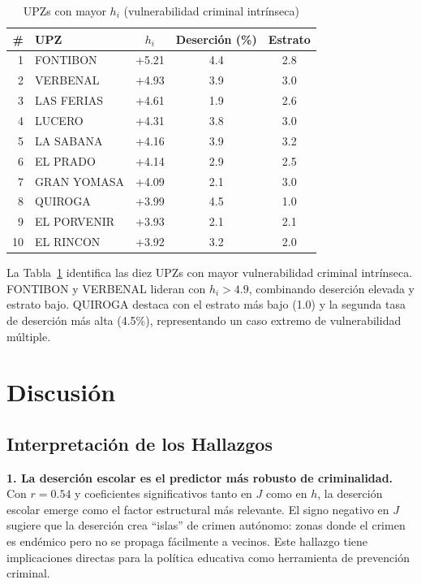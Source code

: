 \documentclass[12pt,a4paper]{article}
\begin{document}
\begin{table}[H]
\centering
\caption{UPZs con mayor $h_i$ (vulnerabilidad criminal intrínseca)}
\label{tab:top10}
\begin{tabular}{@{}rlccc@{}}
\toprule
\textbf{\#} & \textbf{UPZ} & \textbf{$h_i$} & \textbf{Deserción (\%)} & \textbf{Estrato} \\
\midrule
1 & FONTIBON & +5.21 & 4.4 & 2.8 \\
2 & VERBENAL & +4.93 & 3.9 & 3.0 \\
3 & LAS FERIAS & +4.61 & 1.9 & 2.6 \\
4 & LUCERO & +4.31 & 3.8 & 3.0 \\
5 & LA SABANA & +4.16 & 3.9 & 3.2 \\
6 & EL PRADO & +4.14 & 2.9 & 2.5 \\
7 & GRAN YOMASA & +4.09 & 2.1 & 3.0 \\
8 & QUIROGA & +3.99 & 4.5 & 1.0 \\
9 & EL PORVENIR & +3.93 & 2.1 & 2.1 \\
10 & EL RINCON & +3.92 & 3.2 & 2.0 \\
\bottomrule
\end{tabular}
\end{table}

La Tabla~\ref{tab:top10} identifica las diez UPZs con mayor vulnerabilidad criminal intrínseca. FONTIBON y VERBENAL lideran con $h_i > 4.9$, combinando deserción elevada y estrato bajo. QUIROGA destaca con el estrato más bajo (1.0) y la segunda tasa de deserción más alta (4.5\%), representando un caso extremo de vulnerabilidad múltiple.

\section{Discusión}

\subsection{Interpretación de los Hallazgos}

\textbf{1. La deserción escolar es el predictor más robusto de criminalidad.} Con $r = 0.54$ y coeficientes significativos tanto en $J$ como en $h$, la deserción escolar emerge como el factor estructural más relevante. El signo negativo en $J$ sugiere que la deserción crea ``islas'' de crimen autónomo: zonas donde el crimen es endémico pero no se propaga fácilmente a vecinos. Este hallazgo tiene implicaciones directas para la política educativa como herramienta de prevención criminal.
\end{document}
